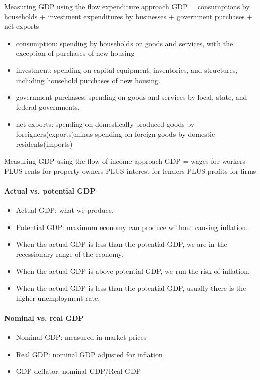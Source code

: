 \documentclass[a4paper,13pt]{report}
\begin{document}
Measuring GDP using the flow expenditure approach
GDP = consumptions by households + investment expenditures by businesses + government purchases + net exports\\

\begin{itemize}
    \item consumption: spending by households on goods and services, with the exception of purchases of new housing
    \item investment: spending on capital equipment, inventories, and structures, including household purchases of new housing.
    \item government purchases: spending on goods and services by local, state, and federal governments.
    \item net exports: spending on domestically produced goods by foreigners(exports)minus spending on foreign goods by domestic residents(imports)
\end{itemize}


Measuring GDP using the flow of income approach
GDP = wages for workers PLUS rents for property owners PLUS interest for lenders PLUS profits for firms


\paragraph{Actual vs. potential GDP}
\begin{itemize}
\item Actual GDP: what we produce. 
\item Potential GDP: maximum economy can produce without causing inflation.
\item When the actual GDP is less than the potential GDP, we are in the recessionary range of the economy.
\item When  the actual GDP is above potential GDP, we run the risk of inflation.
\item When the actual GDP is less than the potential GDP, usually there is the higher unemployment rate.
\end{itemize}

\paragraph{Nominal vs. real GDP}
\begin{itemize}
    \item Nominal GDP: measured in market prices
    \item Real GDP: nominal GDP adjusted for inflation
    \item GDP deflator: nominal GDP/Real GDP
\end{itemize}
\end{document}
